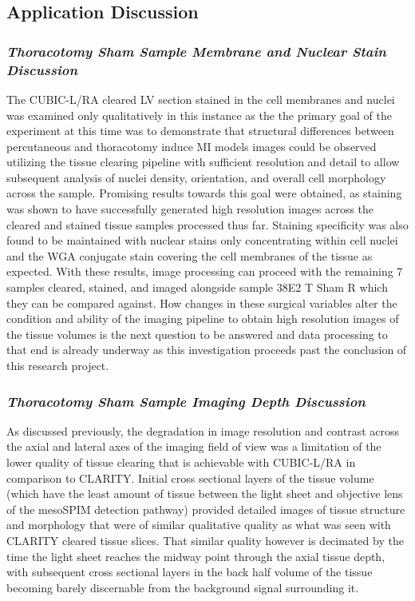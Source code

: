 \subsection{Application Discussion}
\subsubsection{\textit{Thoracotomy Sham Sample Membrane and Nuclear Stain Discussion}}
The CUBIC-L/RA cleared LV section stained in the cell membranes and nuclei was examined only qualitatively in this instance as the the primary goal of the experiment at this time was to demonstrate that structural differences between percutaneous and thoracotomy induce MI models images could be observed utilizing the tissue clearing pipeline with sufficient resolution and detail to allow subsequent analysis of nuclei density, orientation, and overall cell morphology across the sample. Promising results towards this goal were obtained, as staining was shown to have successfully generated high resolution images across the cleared and stained tissue samples processed thus far. Staining specificity was also found to be maintained with nuclear stains only concentrating within cell nuclei and the WGA conjugate stain covering the cell membranes of the tissue as expected. With these results, image processing can proceed with the remaining 7 samples cleared, stained, and imaged alongside sample 38E2 T Sham R which they can be compared against. How changes in these surgical variables alter the condition and ability of the imaging pipeline to obtain high resolution images of the tissue volumes is the next question to be answered and data processing to that end is already underway as this investigation proceeds past the conclusion of this research project.


\subsubsection{\textit{Thoracotomy Sham Sample Imaging Depth Discussion}}
As discussed previously, the degradation in image resolution and contrast across the axial and lateral axes of the imaging field of view was a limitation of the lower quality of tissue clearing that is achievable with CUBIC-L/RA in comparison to CLARITY. Initial cross sectional layers of the tissue volume (which have the least amount of tissue between the light sheet and objective lens of the mesoSPIM detection pathway) provided detailed images of tissue structure and morphology that were of similar qualitative quality as what was seen with CLARITY cleared tissue slices. That similar quality however is decimated by the time the light sheet reaches the midway point through the axial tissue depth, with subsequent cross sectional layers in the back half volume of the tissue becoming barely discernable from the background signal surrounding it.  

